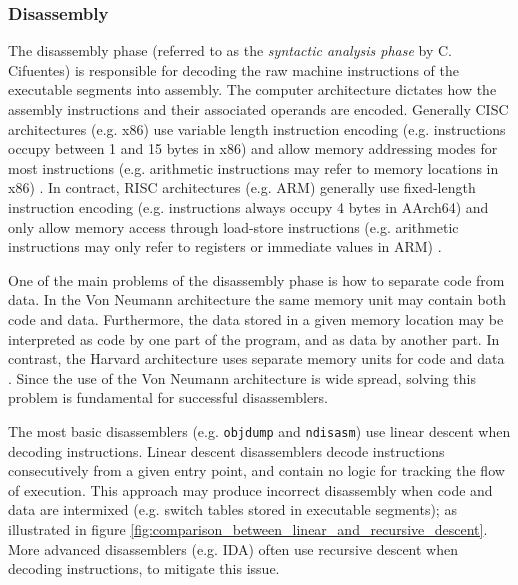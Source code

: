 
\subsubsection{Disassembly}
\label{sec:lit_review_disassembly}

The disassembly phase (referred to as the \textit{syntactic analysis phase} by C. Cifuentes) is responsible for decoding the raw machine instructions of the executable segments into assembly. The computer architecture dictates how the assembly instructions and their associated operands are encoded. Generally CISC architectures (e.g. x86) use variable length instruction encoding (e.g. instructions occupy between 1 and 15 bytes in x86) and allow memory addressing modes for most instructions (e.g. arithmetic instructions may refer to memory locations in x86) \cite{x86_manual}. In contract, RISC architectures (e.g. ARM) generally use fixed-length instruction encoding (e.g. instructions always occupy 4 bytes in AArch64) and only allow memory access through load-store instructions (e.g. arithmetic instructions may only refer to registers or immediate values in ARM) \cite{arm_manual}.

One of the main problems of the disassembly phase is how to separate code from data. In the Von Neumann architecture the same memory unit may contain both code and data. Furthermore, the data stored in a given memory location may be interpreted as code by one part of the program, and as data by another part. In contrast, the Harvard architecture uses separate memory units for code and data \cite{von_neumann_vs_harvard}. Since the use of the Von Neumann architecture is wide spread, solving this problem is fundamental for successful disassemblers.

The most basic disassemblers (e.g. \texttt{objdump} and \texttt{ndisasm}) use linear descent when decoding instructions. Linear descent disassemblers decode instructions consecutively from a given entry point, and contain no logic for tracking the flow of execution. This approach may produce incorrect disassembly when code and data are intermixed (e.g. switch tables stored in executable segments); as illustrated in figure \ref{fig:comparison_between_linear_and_recursive_descent}. More advanced disassemblers (e.g. IDA) often use recursive descent when decoding instructions, to mitigate this issue.

